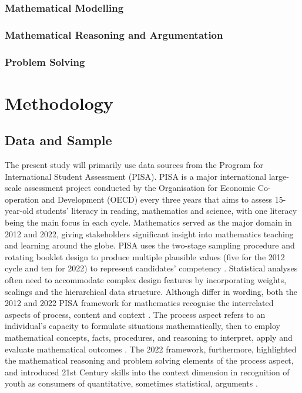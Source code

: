 \documentclass[
    a4paper,                %
    11pt,                   %
    stu,                    %
    donotrepeattitle,       %
    floatsintext,           %
    biblatex,               %
    colorlinks=true,        %
    linkcolor=red,          %
    anchorcolor=black,      %
    citecolor=blue,         %
    urlcolor=blue,          %
    bookmarks=true,         %
    bookmarksopen=false,    %
    bookmarksnumbered=true, %
    dvipsnames              %
]{apa7}
\begin{document}
\subsubsection{Mathematical Modelling}

\subsubsection{Mathematical Reasoning and Argumentation}

\subsubsection{Problem Solving}

\section{Methodology}

\subsection{Data and Sample}

The present study will primarily use data sources from the Program for International Student Assessment (PISA). PISA is a major international large-scale assessment project conducted by the Organisation for Economic Co-operation and Development (OECD) every three years that aims to assess 15-year-old students' literacy in reading, mathematics and science, with one literacy being the main focus in each cycle. Mathematics served as the major domain in 2012 and 2022, giving stakeholders significant insight into mathematics teaching and learning around the globe. PISA uses the two-stage sampling procedure and rotating booklet design to produce multiple plausible values (five for the 2012 cycle and ten for 2022) to represent candidates' competency \parencite{rust:2014}. Statistical analyses often need to accommodate complex design features by incorporating weights, scalings and the hierarchical data structure. Although differ in wording, both the 2012 and 2022 PISA framework for mathematics recognise the interrelated aspects of process, content and context \parencite{oecd:2013}. The process aspect refers to an individual's capacity to formulate situations mathematically, then to employ mathematical concepts, facts, procedures, and reasoning to interpret, apply and evaluate mathematical outcomes \parencite[][p. 28]{oecd:2013}. The 2022 framework, furthermore, highlighted the mathematical reasoning and problem solving elements of the process aspect, and introduced 21st Century skills into the context dimension in recognition of youth as consumers of quantitative, sometimes statistical, arguments \parencite{oecd:2018}.
\end{document}
